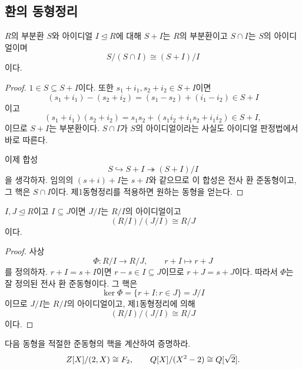 \subsection{환의 동형정리}

\begin{theorem}[제2동형정리]
$R$의 부분환 $S$와 아이디얼 $I\trianglelefteq R$에 대해 $S+I$는 $R$의 부분환이고 $S\cap I$는 $S$의 아이디얼이며
\[
  S/(S\cap I)\cong(S+I)/I
\]
이다.
\end{theorem}

\begin{proof}
$1\in S\subseteq S+I$이다. 또한 $s_1+i_1,s_2+i_2\in S+I$이면
\[
  (s_1+i_1)-(s_2+i_2)=(s_1-s_2)+(i_1-i_2)\in S+I
\]
이고
\[
  (s_1+i_1)(s_2+i_2)
  =s_1s_2+(s_1i_2+i_1s_2+i_1i_2)\in S+I,
\]
이므로 $S+I$는 부분환이다. $S\cap I$가 $S$의 아이디얼이라는 사실도 아이디얼 판정법에서 바로 따른다.

이제 합성
\[
  S\hookrightarrow S+I\twoheadrightarrow(S+I)/I
\]
을 생각하자. 임의의 $(s+i)+I$는 $s+I$와 같으므로 이 합성은 전사 환 준동형이고, 그 핵은 $S\cap I$이다. 제1동형정리를 적용하면 원하는 동형을 얻는다.
\end{proof}

\begin{theorem}[제3동형정리]
$I,J\trianglelefteq R$이고 $I\subseteq J$이면 $J/I$는 $R/I$의 아이디얼이고
\[
  (R/I)/(J/I)\cong R/J
\]
이다.
\end{theorem}

\begin{proof}
사상
\[
  \Phi:R/I\to R/J,
  \qquad r+I\mapsto r+J
\]
를 정의하자. $r+I=s+I$이면 $r-s\in I\subseteq J$이므로 $r+J=s+J$이다. 따라서 $\Phi$는 잘 정의된 전사 환 준동형이다. 그 핵은
\[
  \ker\Phi=\{r+I:r\in J\}=J/I
\]
이므로 $J/I$는 $R/I$의 아이디얼이고, 제1동형정리에 의해
\[
  (R/I)/(J/I)\cong R/J
\]
이다.
\end{proof}

\begin{checkpoint}
다음 동형을 적절한 준동형의 핵을 계산하여 증명하라.
\[
  Z[X]/(2,X)\cong F_2,
  \qquad
  Q[X]/(X^2-2)\cong Q[\sqrt2].
\]
\end{checkpoint}
